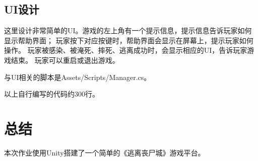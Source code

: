 \documentclass{article}
\begin{document}
\subsection{UI设计}

这里设计非常简单的UI。游戏的左上角有一个提示信息，提示信息告诉玩家如何显示帮助界面；
玩家按下对应按键时，帮助界面会显示在屏幕上，提示玩家如何操作。
玩家被感染、被淹死、摔死、逃离成功时，会显示相应的UI，告诉玩家游戏结束。
玩家可以重启或退出游戏。

与UI相关的脚本是Assets/Scripts/Manager.cs。

以上自行编写的代码约300行。

\section{总结}

本次作业使用Unity搭建了一个简单的《逃离丧尸城》游戏平台。
\end{document}
